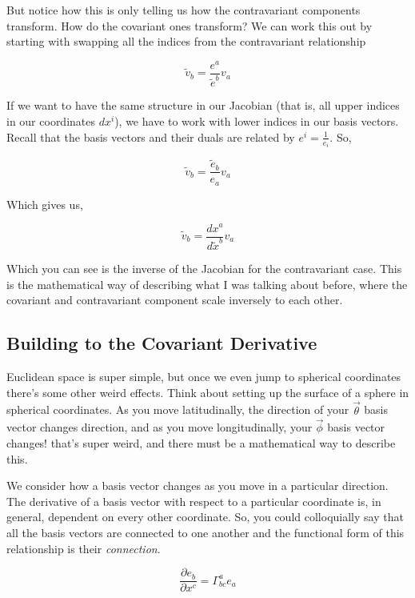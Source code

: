 \documentclass{article}
\begin{document}
But notice how this is only telling us how the contravariant components transform. How do the covariant ones transform? We can work this out by starting with swapping all the indices from the contravariant relationship

\begin{equation}
    \tilde{v}_b = \frac{e^a}{\tilde{e}^b} v_a
\end{equation}

If we want to have the same structure in our Jacobian (that is, all upper indices in our coordinates $dx^i$), we have to work with lower indices in our basis vectors. Recall that the basis vectors and their duals are related by $e^i = \frac{1}{e_i}$. So,

\begin{equation}
    \tilde{v}_b = \frac{\tilde{e}_b}{e_a}v_a
\end{equation}

Which gives us,

\begin{equation}
    \tilde{v}_b = \frac{dx^a}{d\tilde{x}^b} v_a
\end{equation}

Which you can see is the inverse of the Jacobian for the contravariant case. This is the mathematical way of describing what I was talking about before, where the covariant and contravariant component scale inversely to each other.

\subsection{Building to the Covariant Derivative}
Euclidean space is super simple, but once we even jump to spherical coordinates there's some other weird effects. Think about setting up the surface of a sphere in spherical coordinates. As you move latitudinally, the direction of your $\vec{\theta}$ basis vector changes direction, and as you move longitudinally, your $\vec{\phi}$ basis vector changes! that's super weird, and there must be a mathematical way to describe this.

We consider how a basis vector changes as you move in a particular direction. The derivative of a basis vector with respect to a particular coordinate is, in general, dependent on every other coordinate. So, you could colloquially say that all the basis vectors are connected to one another and the functional form of this relationship is their \textit{connection}.

\begin{equation}
    \frac{\partial e_b}{\partial x^c} = \Gamma^a_{bc} e_a
\end{equation}
\end{document}
